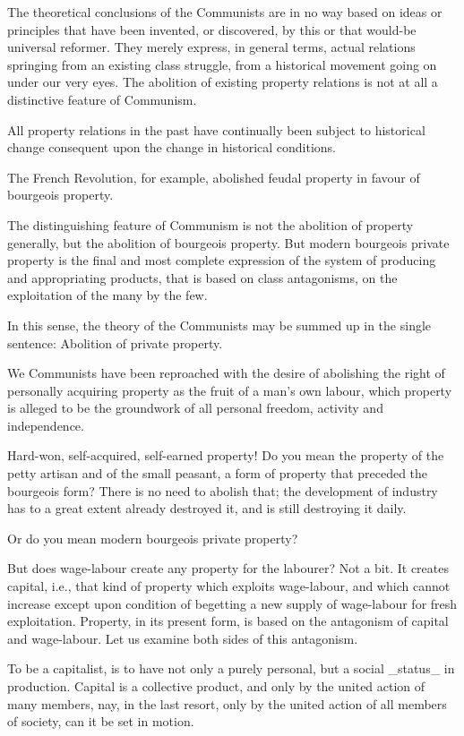 The theoretical conclusions of the Communists are in no way based on
ideas or principles that have been invented, or discovered, by this or
that would-be universal reformer. They merely express, in general
terms, actual relations springing from an existing class struggle, from
a historical movement going on under our very eyes. The abolition of
existing property relations is not at all a distinctive feature of
Communism.

All property relations in the past have continually been subject to
historical change consequent upon the change in historical conditions.

The French Revolution, for example, abolished feudal property in favour
of bourgeois property.

The distinguishing feature of Communism is not the abolition of
property generally, but the abolition of bourgeois property. But modern
bourgeois private property is the final and most complete expression of
the system of producing and appropriating products, that is based on
class antagonisms, on the exploitation of the many by the few.

In this sense, the theory of the Communists may be summed up in the
single sentence: Abolition of private property.

We Communists have been reproached with the desire of abolishing the
right of personally acquiring property as the fruit of a man’s own
labour, which property is alleged to be the groundwork of all personal
freedom, activity and independence.

Hard-won, self-acquired, self-earned property! Do you mean the property
of the petty artisan and of the small peasant, a form of property that
preceded the bourgeois form? There is no need to abolish that; the
development of industry has to a great extent already destroyed it, and
is still destroying it daily.

Or do you mean modern bourgeois private property?

But does wage-labour create any property for the labourer? Not a bit.
It creates capital, i.e., that kind of property which exploits
wage-labour, and which cannot increase except upon condition of
begetting a new supply of wage-labour for fresh exploitation. Property,
in its present form, is based on the antagonism of capital and
wage-labour. Let us examine both sides of this antagonism.

To be a capitalist, is to have not only a purely personal, but a social
_status_ in production. Capital is a collective product, and only by
the united action of many members, nay, in the last resort, only by the
united action of all members of society, can it be set in motion.

